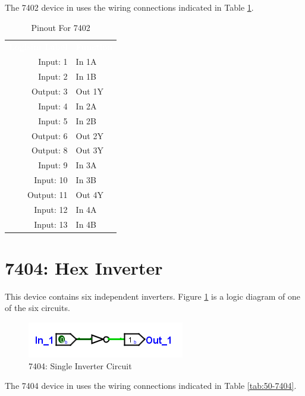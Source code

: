 The 7402 device in \LE uses the wiring connections indicated in Table \ref{tab:50-7402}.

\begin{table}[H]
	\sffamily
	\newcommand{\head}[1]{\textcolor{white}{\textbf{#1}}}		
	\begin{center}
		\begin{tabular}{rl} 
			\rowcolor{black!75}
			\head{Logisim Label} & \head{Function} \\
			Input: 1   & In 1A  \\
			Input: 2   & In 1B  \\
			Output: 3  & Out 1Y \\
			Input: 4   & In 2A  \\
			Input: 5   & In 2B  \\
			Output: 6  & Out 2Y \\
			Output: 8  & Out 3Y \\
			Input: 9   & In 3A  \\
			Input: 10  & In 3B  \\
			Output: 11 & Out 4Y \\
			Input: 12  & In 4A  \\
			Input: 13  & In 4B  \\
		\end{tabular}
	\end{center}
	\caption{Pinout For 7402}
	\label{tab:50-7402}
\end{table}

\section{7404: Hex Inverter}

This device contains six independent inverters. Figure \ref{fig:app_ttl-7404} is a logic diagram of one of the six circuits.

\begin{figure}[H]
	\centering
	\includegraphics{gfx/app_ttl-7404}
	\caption{7404: Single Inverter Circuit}
	\label{fig:app_ttl-7404}
\end{figure}

The 7404 device in \LE uses the wiring connections indicated in Table \ref{tab:50-7404}.

